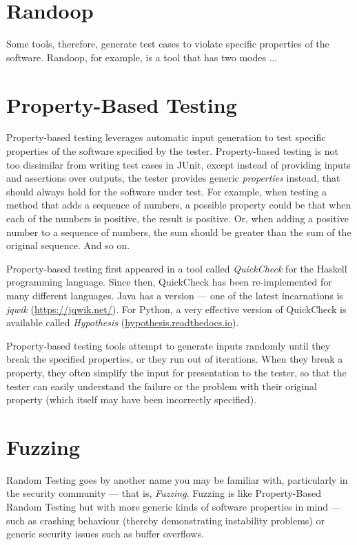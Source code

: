 \section{Randoop}

Some tools, therefore, generate test cases to violate specific properties of the
software. Randoop, for example, is a tool that has two modes ...

\section{Property-Based Testing}

Property-based testing leverages automatic input generation to test specific
properties of the software specified by the tester. Property-based testing is
not too dissimilar from writing test cases in JUnit, except instead of providing
inputs and assertions over outputs, the tester provides generic {\it properties}
instead, that should always hold for the software under test. For example, when
testing a method that adds a sequence of numbers, a possible property could be
that when each of the numbers is positive, the result is positive. Or, when
adding a positive number to a sequence of numbers, the sum should be greater
than the sum of the original sequence. And so on.

Property-based testing first appeared in a tool called {\it QuickCheck} for the
Haskell programming language. Since then, QuickCheck has been re-implemented for
many different languages. Java has a version --- one of the latest incarnations
is {\it jqwik} (\url{https://jqwik.net/}). For Python, a very effective version of
QuickCheck is available called {\it Hypothesis} (\url{hypothesis.readthedocs.io}). 

Property-based testing tools attempt to generate inputs randomly until they
break the specified properties, or they run out of iterations. When they break a
property, they often simplify the input for presentation to the tester, so that
the tester can easily understand the failure or the problem with their original
property (which itself may have been incorrectly specified).

\section{Fuzzing}

Random Testing goes by another name you may be familiar with, particularly in
the security community --- that is, {\it Fuzzing}. Fuzzing is like
Property-Based Random Testing but with more generic kinds of software properties
in mind --- such as crashing behaviour (thereby demonstrating instability
problems) or generic security issues such as buffer overflows.

